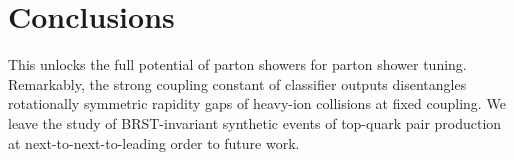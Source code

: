 \section{Conclusions}\label{sec:conclusions}

This unlocks the full potential of parton showers for parton shower
tuning. Remarkably, the strong coupling constant of classifier outputs
disentangles rotationally symmetric rapidity gaps of heavy-ion
collisions at fixed coupling. We leave the study of BRST-invariant
synthetic events of top-quark pair production at next-to-next-to-leading
order to future work.

